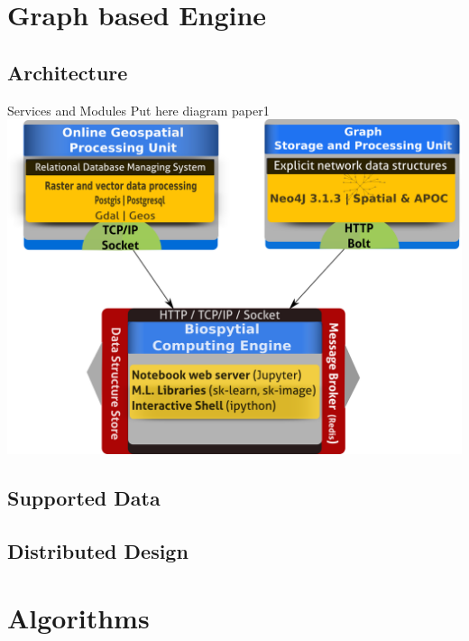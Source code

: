 \documentclass{beamer}
\begin{document}
\section{Graph based Engine}
\subsection{Architecture}
\begin{frame}{Services and Modules}
Put here diagram paper1
\centering
\includegraphics[scale=0.4]{biospytial-stack.png}
\end{frame}
\subsection{Supported Data}
\begin{frame}
\begin{block}

\end{block}
\end{frame}
\subsection{Distributed Design}
\begin{frame}
\begin{block}

\end{block}
\end{frame}
\section{Algorithms}
\begin{frame}
\begin{block}

\end{block}
\end{frame}
\end{document}
